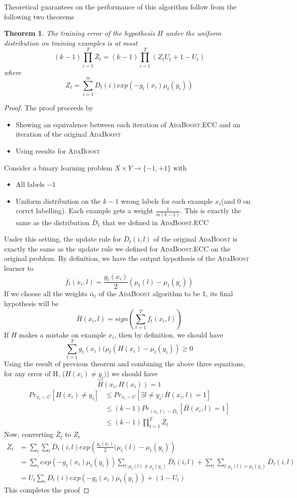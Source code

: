 \documentclass[11pt]{article}
\newtheorem{theorem}{Theorem}
\begin{document}
Theoretical guarantees on the performance of this algorithm follow from the following two theorems
\begin{theorem}
The training error of the hypothesis $H$ under the uniform distribution on training examples is at most $$(k-1)\prod_{i=1}^T \bar Z_t = (k-1)\prod_{i=1}^T (Z_t U_t + 1-U_t)$$ where $$Z_t = \sum_{i=1}^m D_t(i) exp(-g_t(x_i)\mu_t(y_i))$$
\end{theorem}
\begin{proof}
The proof proceeds by 
\begin{itemize}
\item Showing an equivalence between each iteration of \textsc{AdaBoost}.ECC and an iteration of the original \textsc{AdaBoost}
\item Using results for \textsc{AdaBoost}
\end{itemize}
Consider a binary learning problem $X \times Y \rightarrow \{-1,+1\}$ with
\begin{itemize}
\item All labels $-1$
\item Uniform distribution on the $k-1$ wrong labels for each example $x_i$(and 0 on corrct labelling). Each example gets a weight $\frac{1}{m(k-1)}$. This is exactly the same as the distribution $\bar D_1$ that we defined in \textsc{AdaBoost}.ECC
\end{itemize}

Under this setting, the update rule for $\bar D_t(i,l)$ of the original \textsc{AdaBoost} is exactly the same as the update rule we defined for \textsc{AdaBoost}.ECC on the original problem. By definition, we have the output hypothesis of the \textsc{AdaBoost} learner to
$$\bar f_t(x_i,l) = \frac{g_t(x_i)}{2}(\mu_t(l) - \mu_t(y_i))$$
If we choose all the weights $\bar \alpha_t$ of the \textsc{AdaBoost} algorithm to be 1, its final hypothesis will be 
$$\bar H(x_i,l) = sign(\sum_{t=1}^T f_t(x_i, l)) $$
If $H$ makes a mistake on example $x_i$, then by definition, we should have 
$$\sum_{t=1}^T g_t(x_i)(\mu_t(H(x_i) - \mu_t(y_i)) \ge 0$$
Using the result of previous theorem and combining the above three equations, for any error of H, ($H(x_i) \neq y_i)$) we should have $$\hat H(x_i, H(x_i)) = 1$$
\begin{align*}
Pr_{x_i \sim U}[H(x_i) \neq y_i] &\le  Pr_{x_i \sim U}[\exists l \neq y_i : \bar H(x_i, l) = 1]\\
&\le (k-1) Pr_{(x_i, l) \sim \bar D_1} [\bar H(x_i, l) = 1]\\
&\le (k-1) \prod_{t=1}^T \bar Z_t
\end{align*}
Now, converting $\bar Z_t$ to $Z_t$
\begin{align*}
\bar Z_t &= \sum_i \sum_l \bar D_t(i,l) exp\left(\frac{g_t(x_i)}{2}(\mu_t(l)-\mu_t(y_i)\right)\\
&= \sum_i exp(-g_t(x_i)\mu_t(y_i)) \sum_{l: \mu_t(l) \neq \mu_t(y_i)} \bar D_t(i,l) + \sum_i \sum_{l: \mu_t(l) = \mu_t(y_i)} \bar D_t(i,l)\\
&= U_t \sum_i D_t(i) exp(-g_t(x_i) \mu_t(y_i)) + (1-U_t)
\end{align*}
This completes the proof
\end{proof}
\end{document}

